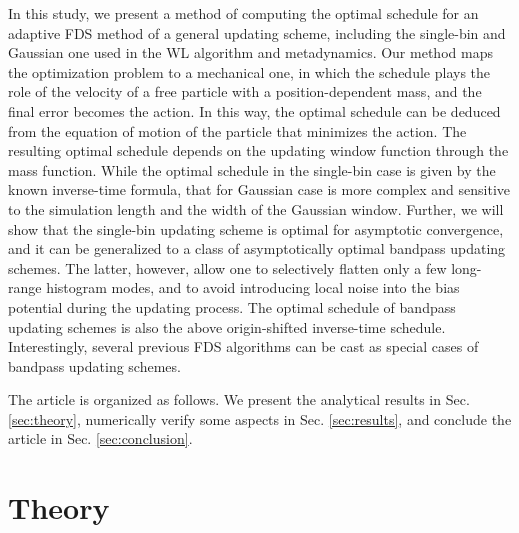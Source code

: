 \documentclass[reprint, superscriptaddress, floatfix]{revtex4-1}
\begin{document}
In this study,
we present a method of computing
the optimal schedule
for an adaptive FDS method
of a general updating scheme,
including the single-bin and Gaussian one
used in the WL algorithm and metadynamics.
%
Our method maps the optimization problem to a mechanical one,
in which the schedule plays the role of the velocity of
a free particle with a position-dependent mass,
and the final error becomes the action.
%
In this way, the optimal schedule
can be deduced from the equation of motion
of the particle that minimizes the action.
%
The resulting optimal schedule
depends on the updating window function
through the mass function.
%
While the optimal schedule in the single-bin case
is given by the known inverse-time formula,
that for Gaussian case is more complex
and sensitive to the simulation length
and the width of the Gaussian window.
%
%
Further, we will show that
the single-bin updating scheme
is optimal for asymptotic convergence,
and it can be generalized
to a class of asymptotically optimal
bandpass updating schemes.
%
The latter, however,
allow one to selectively flatten only
a few long-range histogram modes,
and to avoid introducing local noise
into the bias potential during the updating process.
%
The optimal schedule of bandpass updating schemes
is also the above origin-shifted inverse-time schedule.
%
Interestingly, several previous FDS algorithms\cite{
  langfeld2012, pellegrini2014,
  neuhaus2006, *neuhaus2007}
can be cast as special cases of bandpass updating schemes.

%



The article is organized as follows.
%
We present the analytical results in Sec. \ref{sec:theory},
numerically verify some aspects
in Sec. \ref{sec:results},
and conclude the article
in Sec. \ref{sec:conclusion}.




\section{\label{sec:theory}
Theory}
\end{document}
